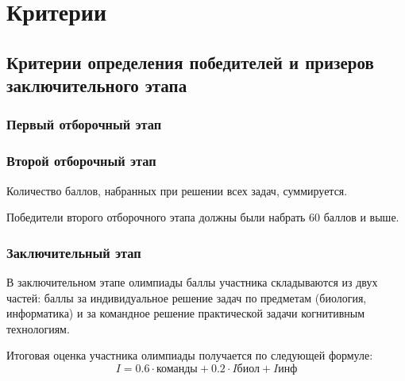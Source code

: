 \part{Критерии}

\chapter{Критерии определения победителей и призеров заключительного этапа}

\section{Первый отборочный этап}

\section{Второй отборочный этап}

Количество баллов, набранных при решении всех задач, суммируется. 

Победители второго отборочного этапа должны были набрать  60 баллов и выше.

\section{Заключительный этап}

В заключительном этапе олимпиады баллы участника складываются из двух
частей: баллы за индивидуальное решение задач по предметам (биология, информатика) и за командное решение практической задачи когнитивным технологиям.

Итоговая оценка участника олимпиады получается по следующей формуле:
$$I =0.6 \cdot \text{команды} + 0.2 \cdot I\text{биол} + I\text{инф}$$